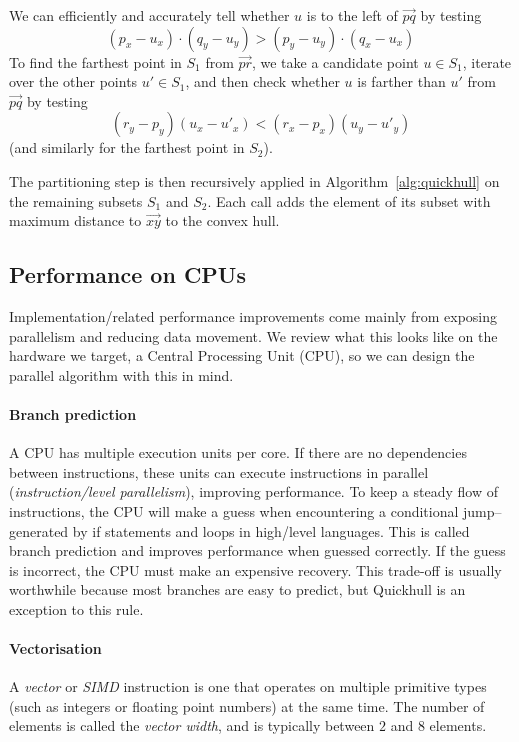 We can efficiently and accurately tell whether $u$ is to the left of $\overrightarrow{pq}$ by testing
\[
(p_x - u_x) \cdot (q_y - u_y) > (p_y - u_y) \cdot (q_x - u_x)
\]
To find the farthest point in $S_1$ from $\overrightarrow{pr}$, we take a candidate point $u \in S_1$, iterate over the other points $u' \in S_1$, and then check whether $u$ is farther than $u'$ from $\overrightarrow{pq}$ by testing
\[
(r_y - p_y) (u_x - u'_x) < (r_x - p_x) (u_y - u'_y)
\]
(and similarly for the farthest point in $S_2$).

The partitioning step is then recursively applied in Algorithm~\ref{alg:quickhull} on the remaining subsets $S_1$ and $S_2$.
Each call adds the element of its subset with maximum distance to $\overrightarrow{xy}$ to the convex hull.

\subsection{Performance on CPUs}\label{sec:performance}
Implementation\-/related performance improvements come mainly from exposing parallelism and reducing data movement.
We review what this looks like on the hardware we target, a Central Processing Unit (CPU), so we can design the parallel algorithm with this in mind.

\paragraph{Branch prediction}
A CPU has multiple execution units per core.
If there are no dependencies between instructions, these units can execute instructions in parallel (\emph{instruction\-/level parallelism}), improving performance.
To keep a steady flow of instructions, the CPU will make a guess when encountering a conditional jump\---generated by if statements and loops in high\-/level languages.
This is called branch prediction and improves performance when guessed correctly.
If the guess is incorrect, the CPU must make an expensive recovery.
This trade-off is usually worthwhile because most branches are easy to predict, but Quickhull is an exception to this rule.

\paragraph{Vectorisation}
A \emph{vector} or \emph{SIMD} instruction is one that operates on multiple primitive types (such as integers or floating point numbers) at the same time.
The number of elements is called the \emph{vector width}, and is typically between $2$ and $8$ elements.

